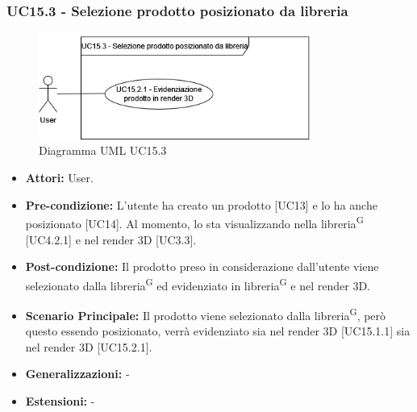 \subsubsection{UC15.3 - Selezione prodotto posizionato da libreria}
\begin{figure}[H]
  \centering
  \includegraphics[width=0.8\textwidth]{UC_diagrams_11-20/UC15.3.drawio.png}
   \caption{Diagramma UML UC15.3}
\end{figure}
\begin{itemize}
    \item \textbf{Attori:} User.
    \item \textbf{Pre-condizione:} L'utente ha creato un prodotto [UC13] e lo ha anche posizionato [UC14]. Al momento, lo sta visualizzando nella libreria\textsuperscript{G} [UC4.2.1] e nel render 3D [UC3.3].
    \item \textbf{Post-condizione:} Il prodotto preso in considerazione dall'utente viene selezionato dalla libreria\textsuperscript{G} ed evidenziato in libreria\textsuperscript{G} e nel render 3D.
    \item \textbf{Scenario Principale:} Il prodotto viene selezionato dalla libreria\textsuperscript{G}, però questo essendo posizionato, verrà evidenziato sia nel render 3D [UC15.1.1] sia nel render 3D [UC15.2.1].
    \item \textbf{Generalizzazioni:} -
    \item \textbf{Estensioni:} -
\end{itemize}

